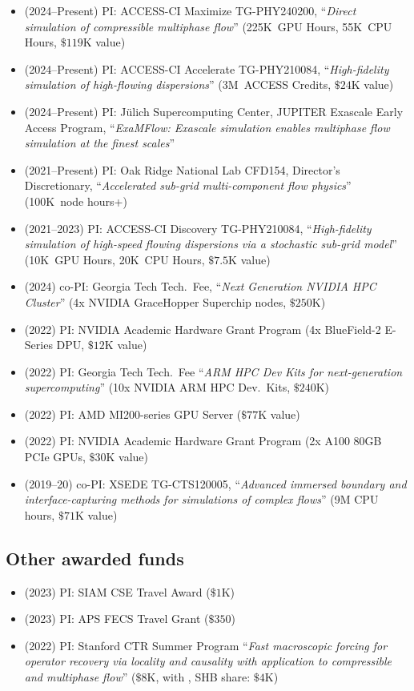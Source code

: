 \begin{itemize}
    \item (2024--Present) PI: ACCESS-CI Maximize TG-PHY240200, ``\textit{Direct simulation of compressible multiphase flow}'' (225K~GPU Hours, 55K~CPU Hours, $\$119$K value)
    \item (2024--Present) PI: ACCESS-CI Accelerate TG-PHY210084, ``\textit{High-fidelity simulation of high-flowing dispersions}'' (3M~ACCESS Credits, $\$24$K value)
    \item (2024--Present) PI: J\"ulich Supercomputing Center, JUPITER Exascale Early Access Program, ``\textit{ExaMFlow: Exascale simulation enables multiphase flow simulation at the finest scales}''
    \item (2021--Present) PI: Oak Ridge National Lab CFD154, Director's Discretionary, ``\textit{Accelerated sub-grid multi-component flow physics}'' (100K~node hours+)
    \item (2021--2023) PI: ACCESS-CI Discovery TG-PHY210084, ``\textit{High-fidelity simulation of high-speed flowing dispersions via a stochastic sub-grid model}'' (10K~GPU Hours, 20K~CPU Hours, $\$7.5$K value)
    \item (2024) co-PI: Georgia Tech Tech.\ Fee, ``\textit{Next Generation NVIDIA HPC Cluster}'' (4x NVIDIA GraceHopper Superchip nodes, $\$250$K)
    \item (2022) PI: NVIDIA Academic Hardware Grant Program (4x BlueField-2 E-Series DPU, $\$12$K value)
    \item (2022) PI: Georgia Tech Tech.\ Fee ``\textit{ARM HPC Dev Kits for next-generation supercomputing}'' (10x NVIDIA ARM HPC Dev.\ Kits, $\$240$K)
    \item (2022) PI: AMD MI200-series GPU Server ($\$77$K value)
    \item (2022) PI: NVIDIA Academic Hardware Grant Program (2x A100 80GB PCIe GPUs, $\$30$K value)
    \item (2019--20) co-PI: XSEDE TG-CTS120005, ``\textit{Advanced immersed boundary and interface-capturing methods for simulations of complex flows}'' (9M CPU hours, $\$71$K value)
\end{itemize}

\subsection{Other awarded funds}

\begin{itemize}
    \item (2023) PI: SIAM CSE Travel Award ($\$1$K)
    \item (2023) PI: APS FECS Travel Grant ($\$350$)
    \item (2022) PI: Stanford CTR Summer Program ``\textit{Fast macroscopic forcing for operator recovery via locality and causality with application to compressible and multiphase flow}'' ($\$8$K, with \Florian, SHB share: $\$4$K)
\end{itemize}

